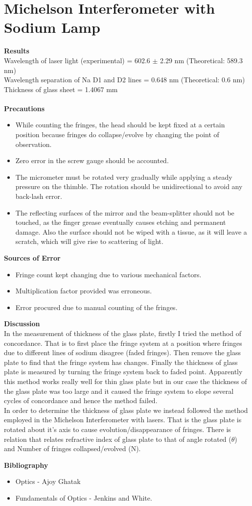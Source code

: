 \documentclass[12pt]{report}
\begin{document}
	\section{Michelson Interferometer with Sodium Lamp}
	\textbf{Results}\\
	Wavelength of laser light (experimental) = 602.6 $\pm$ 2.29 nm (Theoretical: 589.3 nm)\\
	Wavelength separation of Na D1 and D2 lines = 0.648 nm (Theoretical: 0.6 nm)\\
	Thickness of glass sheet = 1.4067 mm \\ \\
	\textbf{Precautions}
	\begin{itemize}
		\item While counting the fringes, the head should be kept fixed at a certain position because fringes do collapse/evolve by changing the point of observation.
		\item Zero error in the screw gauge should be accounted.
		\item The micrometer must be rotated very gradually while applying a steady pressure
		on the thimble. The rotation should be unidirectional to avoid any back-lash error.
		\item The reflecting surfaces of the mirror and the beam-splitter should not be touched,
		as the finger grease eventually causes etching and permanent damage. Also the
		surface should not be wiped with a tissue, as it will leave a scratch, which will
		give rise to scattering of light.
	\end{itemize}
	\textbf{Sources of Error}
	\begin{itemize}
		\item Fringe count kept changing due to various mechanical factors. 
		\item Multiplication factor provided was erroneous. 
		\item Error procured due to manual counting of the fringes. 
	\end{itemize}
	\textbf{Discussion}\\
	In the measurement of thickness of the glass plate, firstly I tried the method of concordance. That is to first place the fringe system at a position where fringes due to different lines of sodium disagree (faded fringes). Then remove the glass plate to find that the fringe system has changes. Finally the thickness of glass plate is measured by turning the fringe system back to faded point. Apparently this method works really well for thin glass plate but in our case the thickness of the glass plate was too large and it caused the fringe system to elope several cycles of concordance and hence the method failed.\\
	In order to determine the thickness of glass plate we instead followed the method employed in the Michelson Interferometer with lasers. That is the glass plate is rotated about it's axis to cause evolution/disappearance of fringes. There is relation that relates refractive index of glass plate to that of angle rotated ($\theta$) and Number of fringes collapsed/evolved (N). 
	
	\newpage
	\Large{\textbf{Bibliography}}
	\begin{itemize}
		\item Optics - Ajoy Ghatak
		\item Fundamentals of Optics - Jenkins and White.
	\end{itemize}
	
\end{document}
